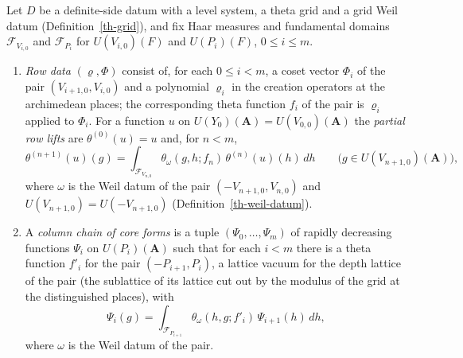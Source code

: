 \begin{definition}\label{th-core-chain}
Let $D$ be a definite-side datum with a level system, a theta grid and a grid
Weil datum (Definition~\ref{th-grid}), and fix Haar measures and fundamental
domains $\mathcal F_{V_{i,0}}$ and $\mathcal F_{P_i}$ for $U(V_{i,0})(F)$ and
$U(P_i)(F)$, $0\leq i\leq m$.
\begin{enumerate}
\item \emph{Row data} $(\varrho,\Phi)$ consist of, for each $0\leq i<m$, a
  coset vector $\Phi_i$ of the pair $(V_{i+1,0},V_{i,0})$ and a polynomial
  $\varrho_i$ in the creation operators at the archimedean places; the
  corresponding theta function $f_i$ of the pair is $\varrho_i$ applied to
  $\Phi_i$. For a function $u$ on $U(Y_0)(\mathbf A)=U(V_{0,0})(\mathbf A)$
  the \emph{partial row lifts} are $\theta^{(0)}(u)=u$ and, for $n<m$,
  \[
  \theta^{(n+1)}(u)(g)=\int_{\mathcal F_{V_{n,0}}}\theta_{\omega}(g,h;f_n)\,
  \theta^{(n)}(u)(h)\,dh\qquad\bigl(g\in U(V_{n+1,0})(\mathbf A)\bigr),
  \]
  where $\omega$ is the Weil datum of the pair $(-V_{n+1,0},V_{n,0})$ and
  $U(V_{n+1,0})=U(-V_{n+1,0})$ (Definition~\ref{th-weil-datum}).
\item A \emph{column chain of core forms} is a tuple $(\Psi_0,\ldots,\Psi_m)$
  of rapidly decreasing functions $\Psi_i$ on $U(P_i)(\mathbf A)$ such that for
  each $i<m$ there is a theta function $f'_i$ for the pair $(-P_{i+1},P_i)$,
  a lattice vacuum for the depth lattice of the pair (the sublattice of its
  lattice cut out by the modulus of the grid at the distinguished places),
  with
  \[
  \Psi_i(g)=\int_{\mathcal F_{P_{i+1}}}\theta_\omega(h,g;f'_i)\,\Psi_{i+1}(h)\,dh,
  \]
  where $\omega$ is the Weil datum of the pair.
\end{enumerate}
\end{definition}

